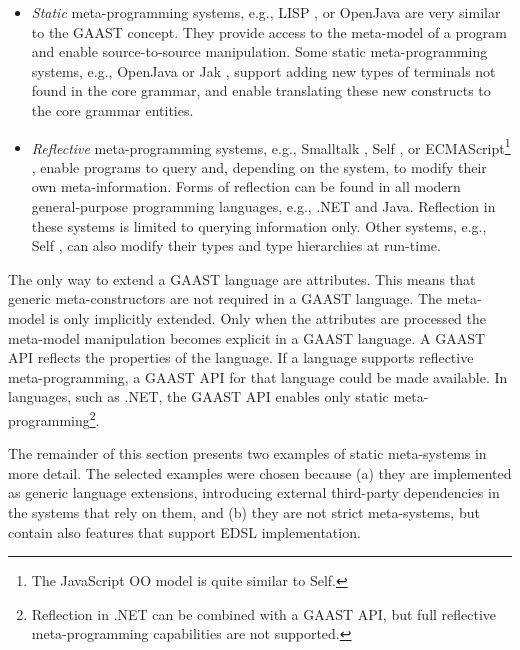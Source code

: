 \begin{itemize}
\item \textit{Static} meta-programming systems, e.g., LISP \cite{lisp}, or OpenJava \cite{java.openJava} are very similar to the GAAST concept. They provide access to the meta-model of a program and enable source-to-source manipulation. Some static meta-programming systems, e.g., OpenJava \cite{java.openJava} or Jak \cite{batory98jts}, support adding new types of terminals not found in the core grammar, and enable translating these new constructs to the core grammar entities. 

\item \textit{Reflective} meta-programming systems, e.g., Smalltalk \cite{smalltalk}, Self \cite{www.self}, or ECMA\-Script\footnote{The JavaScript OO model is quite similar to Self.} \cite{ECMAScript}, enable programs to query and, depending on the system, to modify their own meta-information. Forms of reflection can be found in all modern general-purpose programming languages, e.g., .NET and Java. Reflection in these systems is limited to querying information only. Other systems, e.g., Self \cite{www.self}, can also modify their types and type hierarchies at run-time.

\end{itemize}

The only way to extend a GAAST language are attributes. This means that generic meta-constructors are not required in a GAAST language. The meta-model is only implicitly extended. Only when the attributes are processed the meta-model manipulation becomes explicit in a GAAST language. A GAAST API reflects the properties of the language. If a language supports reflective meta-programming, a GAAST API for that language could be made available. In languages, such as .NET, the GAAST API enables only static meta-programming\footnote{Reflection in .NET can be combined with a GAAST API, but full reflective meta-programming capabilities are not supported.}.

The remainder of this section presents two examples of static meta-systems in more detail. The selected examples were chosen because (a) they are implemented as generic language extensions, introducing external third-party dependencies in the systems that rely on them, and (b) they are not strict meta-systems, but contain also features that support EDSL implementation.

